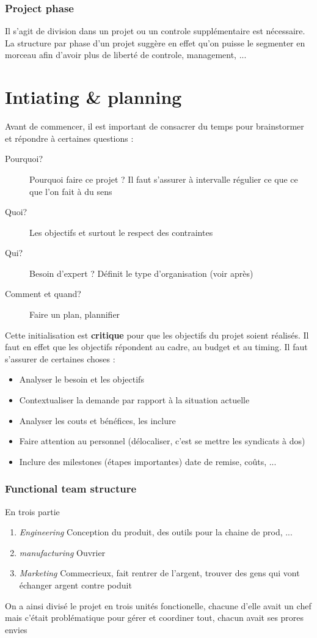 \subsection{Project phase}
Il s'agit de division dans un projet ou un controle supplémentaire est nécessaire. La structure par 
phase d'un projet suggère en effet qu'on puisse le segmenter en morceau afin d'avoir plus de liberté de 
controle, management, ...


\chapter{Intiating \& planning}
Avant de commencer, il est important de consacrer du temps pour brainstormer et répondre à certaines 
questions :
\begin{description}
\item[Pourquoi?] Pourquoi faire ce projet ? Il faut s'assurer à intervalle régulier ce que ce que l'on 
fait à du sens
\item[Quoi?] Les objectifs et surtout le respect des contraintes
\item[Qui?] Besoin d'expert ? Définit le type d'organisation (voir après)
\item[Comment et quand?] Faire un plan, plannifier
\end{description}
Cette initialisation est \textbf{critique} pour que les objectifs du projet soient réalisés. Il faut 
en effet que les objectifs répondent au cadre, au budget et au timing. Il faut s'assurer de certaines choses :
\begin{itemize}
\item Analyser le besoin et les objectifs
\item Contextualiser la demande par rapport à la situation actuelle
\item Analyser les couts et bénéfices, les inclure
\item Faire attention au personnel (délocaliser, c'est se mettre les syndicats à dos)
\item Inclure des milestones (étapes importantes) date de remise, coûts, ... 
\end{itemize}

\subsection{Functional team structure}
En trois partie
\begin{enumerate}
\item \textit{Engineering} Conception du produit, des outils pour la chaine de prod, ...
 \item \textit{manufacturing} Ouvrier
 \item \textit{Marketing} Commecrieux, fait rentrer de l'argent, trouver des gens qui vont échanger argent contre poduit
\end{enumerate}
On a ainsi divisé le projet en trois unités fonctionelle, chacune d'elle avait un chef mais c'était 
problématique pour gérer et coordiner tout, chacun avait ses prores envies
